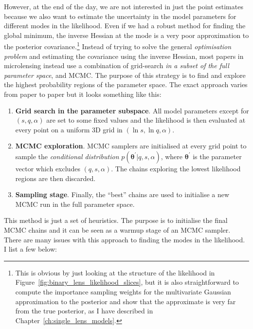 \documentclass[12pt,dvipsnames]{report}
\renewcommand{\vec}[1]{\boldsymbol{\mathbf{#1}}}
\begin{document}
However, at the end of the day, we are not interested in just the point estimates 
because we also want to estimate the uncertainty in the model parameters for different modes 
in the likelihood. Even if we had a robust method for finding the global minimum, the inverse 
Hessian at the mode is a very poor approximation to the posterior covariance.\footnote{
    This is obvious by just looking at the structure of the likelihood in
    Figure~\ref{fig:binary_lens_likelihood_slices}, but it is also straightforward to 
    compute the importance sampling weights for the multivariate Gaussian approximation
    to the posterior and show that the approximate is very far from the true posterior, 
    as I have described in Chapter~\ref{ch:single_lens_models}.}
Instead of trying to solve the general \emph{optimisation problem} and estimating the covariance 
using the inverse Hessian, most papers in microlensing instead use a combination 
of grid-search \emph{in a subset of the full parameter space}, and MCMC. The purpose 
of this strategy is to find and explore the highest probability regions of the parameter space. 
The exact approach varies from paper to paper but it looks something like this:
\begin{enumerate}
\item \textbf{Grid search in the parameter subspace}. All model parameters except for 
$(s,q,\alpha)$ are set to some fixed values and the likelihood is then evaluated at every point 
on a uniform 3D grid in $(\ln s,\ln q,\alpha)$.
\item \textbf{MCMC exploration}. MCMC samplers are initialised at every grid point to 
sample the \emph{conditional distribution} $p(\vec\theta^\prime|q,s,\alpha)$, where 
$\vec\theta^\prime$ is the parameter vector which excludes $(q,s,\alpha)$. The chains 
exploring the lowest likelihood regions are then discarded.
\item \textbf{Sampling stage}. Finally, the ``best'' chains are used to initialise a new
MCMC run in the full parameter space.
\end{enumerate}
This method is just a set of heuristics. The purpose is to initialise the final MCMC 
chains and it can be seen as a warmup stage of an MCMC sampler. 
There are many issues with this approach to finding the modes in the likelihood.
I list a few below:
\end{document}
